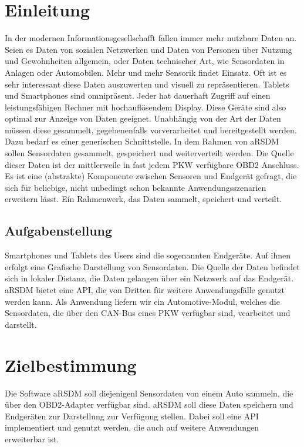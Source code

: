\documentclass[pflichtenheft.tex]{subfiles}
\begin{document}
\chapter{Einleitung}

In der modernen Informationsgesellschafft fallen immer mehr nutzbare Daten an. Seien es Daten von sozialen Netzwerken und Daten von Personen über Nutzung und Gewohnheiten allgemein, oder Daten technischer Art, wie Sensordaten in Anlagen oder Automobilen. Mehr und mehr Sensorik findet Einsatz. Oft ist es sehr interessant diese Daten auszuwerten und visuell zu repräsentieren. Tablets und Smartphones sind omnipräsent. Jeder hat dauerhaft Zugriff auf einen leistungsfähigen Rechner mit hochauflösendem Display. Diese Geräte sind also optimal zur Anzeige von Daten geeignet. Unabhängig von der Art der Daten müssen diese gesammelt, gegebenenfalls vorverarbeitet und bereitgestellt werden. Dazu bedarf es einer generischen Schnittstelle. In dem Rahmen von aRSDM sollen Sensordaten gesammelt, gespeichert und weiterverteilt werden. Die Quelle dieser Daten ist der mittlerweile in fast jedem PKW verfügbare OBD2 Anschluss. Es ist eine (abstrakte) Komponente zwischen Sensoren und Endgerät gefragt, die sich für beliebige, nicht unbedingt schon bekannte Anwendungsszenarien erweitern lässt. Ein Rahmenwerk, das Daten sammelt, speichert und verteilt.

\section{Aufgabenstellung}

Smartphones und Tablets des Users sind die sogenannten Endgeräte. Auf ihnen erfolgt eine Grafische Darstellung von Sensordaten. Die Quelle der Daten befindet sich in lokaler Distanz, die Daten gelangen über ein Netzwerk auf das Endgerät. aRSDM bietet eine API, die von Dritten für weitere Anwendungsfälle genutzt werden kann. Als Anwendung liefern wir ein Automotive-Modul, welches die Sensordaten, die über den CAN-Bus eines PKW verfügbar sind, vearbeitet und darstellt.


\chapter{Zielbestimmung}

Die Software aRSDM soll diejenigenl Sensordaten von einem Auto sammeln, die über den OBD2-Adapter verfügbar sind. aRSDM soll diese Daten speichern und Endgeräten zur Darstellung zur Verfügung stellen. Dabei soll eine API implementiert und genutzt werden, die auch auf weitere Anwendungen erweiterbar ist.
\end{document}
